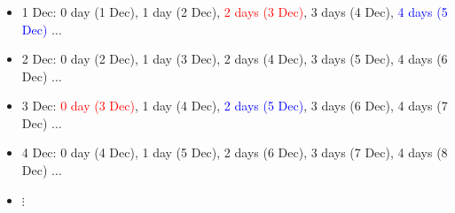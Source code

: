 \documentclass[aspectratio=169]{beamer}
\begin{document}
\begin{frame}
\frametitle{}

\small{
\begin{itemize}
\item 1 Dec: 0 day (1 Dec), 1 day (2 Dec), \textcolor{red}{2 days (3 Dec)}, 3 days (4 Dec), \textcolor{blue}{4 days (5 Dec)}  $\ldots$
\item 2 Dec: 0 day (2 Dec), 1 day (3 Dec), 2 days (4 Dec), 3 days (5 Dec), 4 days (6 Dec)  $\ldots$
\item 3 Dec: \textcolor{red}{0 day (3 Dec)}, 1 day (4 Dec), \textcolor{blue}{2 days (5 Dec)}, 3 days (6 Dec), 4 days (7 Dec) $\ldots$
\item 4 Dec: 0 day (4 Dec), 1 day (5 Dec), 2 days (6 Dec),  3 days (7 Dec), 4 days (8 Dec) $\ldots$
\item $\vdots$
\end{itemize}
}

\vfill
{}  \\
 

\end{frame}
\end{document}

